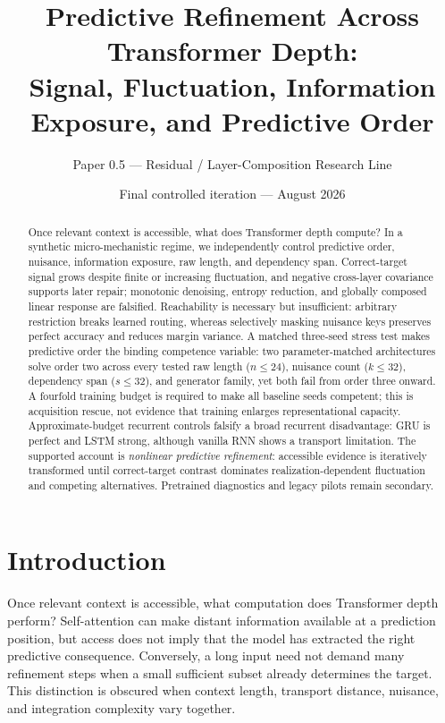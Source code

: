 \documentclass[10pt]{article}
\title{Predictive Refinement Across Transformer Depth:\\Signal, Fluctuation, Information Exposure, and Predictive Order}
\author{Paper 0.5 --- Residual / Layer-Composition Research Line}
\date{Final controlled iteration --- August 2026}
\begin{document}
\maketitle

\begin{abstract}
Once relevant context is accessible, what does Transformer depth compute? In a synthetic micro-mechanistic regime, we independently control predictive order, nuisance, information exposure, raw length, and dependency span. Correct-target signal grows despite finite or increasing fluctuation, and negative cross-layer covariance supports later repair; monotonic denoising, entropy reduction, and globally composed linear response are falsified. Reachability is necessary but insufficient: arbitrary restriction breaks learned routing, whereas selectively masking nuisance keys preserves perfect accuracy and reduces margin variance. A matched three-seed stress test makes predictive order the binding competence variable: two parameter-matched architectures solve order two across every tested raw length ($n\le24$), nuisance count ($k\le32$), dependency span ($s\le32$), and generator family, yet both fail from order three onward. A fourfold training budget is required to make all baseline seeds competent; this is acquisition rescue, not evidence that training enlarges representational capacity. Approximate-budget recurrent controls falsify a broad recurrent disadvantage: GRU is perfect and LSTM strong, although vanilla RNN shows a transport limitation. The supported account is \emph{nonlinear predictive refinement}: accessible evidence is iteratively transformed until correct-target contrast dominates realization-dependent fluctuation and competing alternatives. Pretrained diagnostics and legacy pilots remain secondary.
\end{abstract}

\section{Introduction}
Once relevant context is accessible, what computation does Transformer depth perform? Self-attention can make distant information available at a prediction position, but access does not imply that the model has extracted the right predictive consequence. Conversely, a long input need not demand many refinement steps when a small sufficient subset already determines the target. This distinction is obscured when context length, transport distance, nuisance, and integration complexity vary together.
\end{document}
